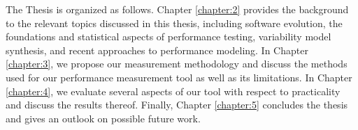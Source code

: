 The Thesis is organized as follows. Chapter \ref{chapter:2} provides the
background to the relevant topics discussed in this thesis, including software
evolution, the foundations and statistical aspects of performance testing,
variability model synthesis, and recent approaches to performance modeling. In
Chapter \ref{chapter:3}, we propose our measurement methodology and discuss
the methods used for our performance measurement tool as well as its
limitations. In Chapter \ref{chapter:4}, we evaluate several aspects of our
tool with respect to practicality and discuss the results thereof. Finally,
Chapter \ref{chapter:5} concludes the thesis and gives an outlook on possible
future work.
